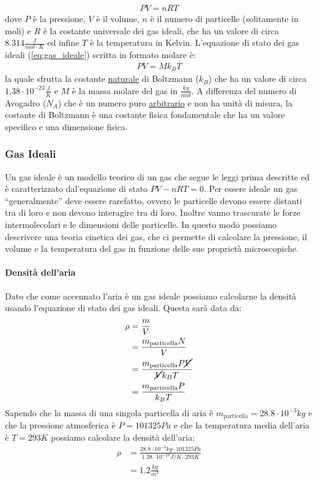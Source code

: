         \begin{align}
            PV = nRT \label{eq:gas_ideale}
        \end{align}
        dove $P$ è la pressione, $V$ è il volume, $n$ è il numero di particelle (solitamente in moli) e $R$ è la costante universale dei gas ideali, che ha un valore di circa $8.314 \frac{J}{mol \cdot K}$ ed infine $T$ è la temperatura in Kelvin.\newline 
        L'equazione di stato dei gas ideali (\ref{eq:gas_ideale}) scritta in formato molare è:
        \begin{align}
            PV = Mk_{B}T
        \end{align}
        la quale sfrutta la costante \underline{naturale} di Boltzmann ($k_B$) che ha un valore di circa $1.38 \cdot 10^{-23} \frac{J}{K}$ e $M$ è la massa molare del gas in $\frac{kg}{mol}$. A differenza del numero di Avogadro ($N_A$) che è un numero puro \underline{arbitrario} e non ha unità di misura, la costante di Boltzmann è una costante fisica fondamentale che ha un valore specifico e una dimensione fisica.
        \subsubsection{Gas Ideali}
            Un gas ideale è un modello teorico di un gas che segue le leggi prima descritte ed è caratterizzato dal'equazione di stato $PV-nRT = 0$. Per essere ideale un gas ``generalmente'' deve essere rarefatto, ovvero le particelle devono essere distanti tra di loro e non devono interagire tra di loro. Inoltre vanno trascurate le forze intermolecolari e le dimensioni delle particelle. In questo modo possiamo descrivere una teoria cinetica dei gas, che ci permette di calcolare la pressione, il volume e la temperatura del gas in funzione delle sue proprietà microscopiche. 
            \paragraph{Densità dell'aria}
                Dato che come accennato l'aria è un gas ideale possiamo calcolarne la densità usando l'equazione di stato dei gas ideali. Questa sarà data da:
                \begin{align*}
                    \rho &= \frac{m}{V}\\
                    &= \frac{m_{\text{particella}}N}{V}\\
                    &= \frac{m_{\text{particella}}P\cancel{V}}{\cancel{V}k_{B}T}\\
                    &= \frac{m_{\text{particella}}P}{k_{B}T}
                \end{align*}
                Sapendo che la massa di una singola particella di aria è $m_{\text{particella}}=28.8\cdot 10^{-3}kg$ e che la pressione atmosferica è $P=101325Pa$ e che la temperatura media dell'aria è $T=293K$ possiamo calcolare la densità dell'aria:
                \begin{align*}
                    \rho &= \frac{28.8\cdot 10^{-3}kg\cdot 101325Pa}{1.38\cdot 10^{-23}J/K\cdot 293K}\\
                    &= 1.2\frac{kg}{m^3}
                \end{align*}
